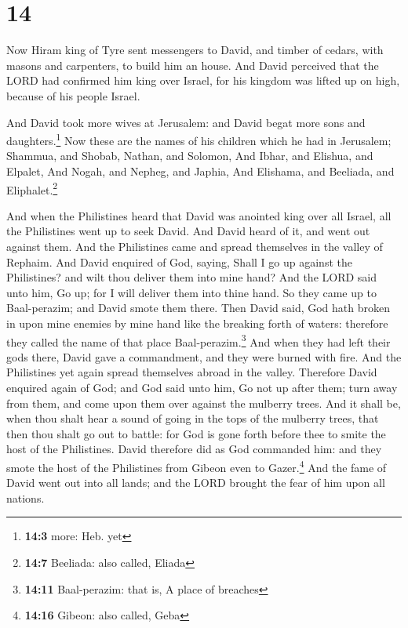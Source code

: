 \hypertarget{section-13}{%
\section{14}\label{section-13}}

 Now Hiram king of Tyre sent messengers to David, and
timber of cedars, with masons and carpenters, to build him an house.
 And David perceived that the LORD had confirmed him king
over Israel, for his kingdom was lifted up on high, because of his
people Israel.

 And David took more wives at Jerusalem: and David begat
more sons and daughters.\footnote{\textbf{14:3} more: Heb. yet}
 Now these are the names of his children which he had in
Jerusalem; Shammua, and Shobab, Nathan, and Solomon,  And
Ibhar, and Elishua, and Elpalet,  And Nogah, and Nepheg,
and Japhia,  And Elishama, and Beeliada, and
Eliphalet.\footnote{\textbf{14:7} Beeliada: also called, Eliada}

 And when the Philistines heard that David was anointed
king over all Israel, all the Philistines went up to seek David. And
David heard of it, and went out against them.  And the
Philistines came and spread themselves in the valley of Rephaim.
 And David enquired of God, saying, Shall I go up against
the Philistines? and wilt thou deliver them into mine hand? And the LORD
said unto him, Go up; for I will deliver them into thine hand.
 So they came up to Baal-perazim; and David smote them
there. Then David said, God hath broken in upon mine enemies by mine
hand like the breaking forth of waters: therefore they called the name
of that place Baal-perazim.\footnote{\textbf{14:11} Baal-perazim: that
  is, A place of breaches}  And when they had left their
gods there, David gave a commandment, and they were burned with fire.
 And the Philistines yet again spread themselves abroad
in the valley.  Therefore David enquired again of God;
and God said unto him, Go not up after them; turn away from them, and
come upon them over against the mulberry trees.  And it
shall be, when thou shalt hear a sound of going in the tops of the
mulberry trees, that then thou shalt go out to battle: for God is gone
forth before thee to smite the host of the Philistines. 
David therefore did as God commanded him: and they smote the host of the
Philistines from Gibeon even to Gazer.\footnote{\textbf{14:16} Gibeon:
  also called, Geba}  And the fame of David went out into
all lands; and the LORD brought the fear of him upon all nations.

